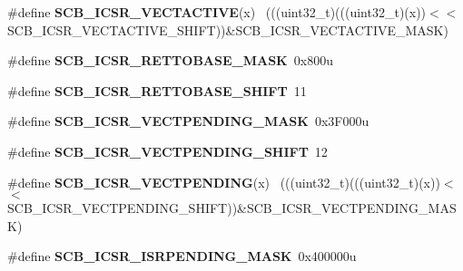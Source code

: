 \begin{DoxyCompactItemize}
\item 
\hypertarget{group___s_c_b___register___masks_gacb9e76e7fa9000878ba2be80556f2013}{}\#define {\bfseries S\+C\+B\+\_\+\+I\+C\+S\+R\+\_\+\+V\+E\+C\+T\+A\+C\+T\+I\+V\+E}(x)                                  ~(((uint32\+\_\+t)(((uint32\+\_\+t)(x))$<$$<$S\+C\+B\+\_\+\+I\+C\+S\+R\+\_\+\+V\+E\+C\+T\+A\+C\+T\+I\+V\+E\+\_\+\+S\+H\+I\+F\+T))\&S\+C\+B\+\_\+\+I\+C\+S\+R\+\_\+\+V\+E\+C\+T\+A\+C\+T\+I\+V\+E\+\_\+\+M\+A\+S\+K)\label{group___s_c_b___register___masks_gacb9e76e7fa9000878ba2be80556f2013}

\item 
\hypertarget{group___s_c_b___register___masks_gacda381108ff1ef433d9eb72675daa756}{}\#define {\bfseries S\+C\+B\+\_\+\+I\+C\+S\+R\+\_\+\+R\+E\+T\+T\+O\+B\+A\+S\+E\+\_\+\+M\+A\+S\+K}~0x800u\label{group___s_c_b___register___masks_gacda381108ff1ef433d9eb72675daa756}

\item 
\hypertarget{group___s_c_b___register___masks_ga45dfe30e87627611e59ecb380dea9b54}{}\#define {\bfseries S\+C\+B\+\_\+\+I\+C\+S\+R\+\_\+\+R\+E\+T\+T\+O\+B\+A\+S\+E\+\_\+\+S\+H\+I\+F\+T}~11\label{group___s_c_b___register___masks_ga45dfe30e87627611e59ecb380dea9b54}

\item 
\hypertarget{group___s_c_b___register___masks_ga75b38d5feedc920a7d0a51484330b7d7}{}\#define {\bfseries S\+C\+B\+\_\+\+I\+C\+S\+R\+\_\+\+V\+E\+C\+T\+P\+E\+N\+D\+I\+N\+G\+\_\+\+M\+A\+S\+K}~0x3\+F000u\label{group___s_c_b___register___masks_ga75b38d5feedc920a7d0a51484330b7d7}

\item 
\hypertarget{group___s_c_b___register___masks_ga345baf83f90de34c6c67edb24968fcc7}{}\#define {\bfseries S\+C\+B\+\_\+\+I\+C\+S\+R\+\_\+\+V\+E\+C\+T\+P\+E\+N\+D\+I\+N\+G\+\_\+\+S\+H\+I\+F\+T}~12\label{group___s_c_b___register___masks_ga345baf83f90de34c6c67edb24968fcc7}

\item 
\hypertarget{group___s_c_b___register___masks_ga17bdf1522c873773ad5e72052f2591c6}{}\#define {\bfseries S\+C\+B\+\_\+\+I\+C\+S\+R\+\_\+\+V\+E\+C\+T\+P\+E\+N\+D\+I\+N\+G}(x)                                ~(((uint32\+\_\+t)(((uint32\+\_\+t)(x))$<$$<$S\+C\+B\+\_\+\+I\+C\+S\+R\+\_\+\+V\+E\+C\+T\+P\+E\+N\+D\+I\+N\+G\+\_\+\+S\+H\+I\+F\+T))\&S\+C\+B\+\_\+\+I\+C\+S\+R\+\_\+\+V\+E\+C\+T\+P\+E\+N\+D\+I\+N\+G\+\_\+\+M\+A\+S\+K)\label{group___s_c_b___register___masks_ga17bdf1522c873773ad5e72052f2591c6}

\item 
\hypertarget{group___s_c_b___register___masks_gaccd41792c40fc7ab2b03678da539ad65}{}\#define {\bfseries S\+C\+B\+\_\+\+I\+C\+S\+R\+\_\+\+I\+S\+R\+P\+E\+N\+D\+I\+N\+G\+\_\+\+M\+A\+S\+K}~0x400000u\label{group___s_c_b___register___masks_gaccd41792c40fc7ab2b03678da539ad65}


\end{DoxyCompactItemize}
